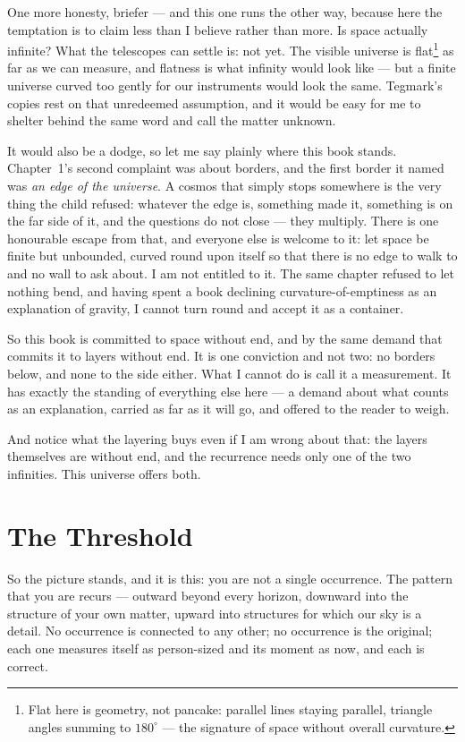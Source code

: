\documentclass[fontsize=11pt,paper=a4,pagesize=auto,parskip=half-]{scrbook}
\begin{document}
One more honesty, briefer --- and this one runs the other way, because here the temptation is to claim less than I believe rather than more. Is space actually infinite? What the telescopes can settle is: not yet. The visible universe is flat\footnote{Flat here is geometry, not pancake: parallel lines staying parallel, triangle angles summing to $180^{\circ}$ --- the signature of space without overall curvature.} as far as we can measure, and flatness is what infinity would look like --- but a finite universe curved too gently for our instruments would look the same. Tegmark's copies rest on that unredeemed assumption, and it would be easy for me to shelter behind the same word and call the matter unknown.

It would also be a dodge, so let me say plainly where this book stands. Chapter~1's second complaint was about borders, and the first border it named was \emph{an edge of the universe}. A cosmos that simply stops somewhere is the very thing the child refused: whatever the edge is, something made it, something is on the far side of it, and the questions do not close --- they multiply. There is one honourable escape from that, and everyone else is welcome to it: let space be finite but unbounded, curved round upon itself so that there is no edge to walk to and no wall to ask about. I am not entitled to it. The same chapter refused to let nothing bend, and having spent a book declining curvature-of-emptiness as an explanation of gravity, I cannot turn round and accept it as a container.

So this book is committed to space without end, and by the same demand that commits it to layers without end. It is one conviction and not two: no borders below, and none to the side either. What I cannot do is call it a measurement. It has exactly the standing of everything else here --- a demand about what counts as an explanation, carried as far as it will go, and offered to the reader to weigh.

And notice what the layering buys even if I am wrong about that: the layers themselves are without end, and the recurrence needs only one of the two infinities. This universe offers both.

\section{The Threshold}

So the picture stands, and it is this: you are not a single occurrence. The pattern that you are recurs --- outward beyond every horizon, downward into the structure of your own matter, upward into structures for which our sky is a detail. No occurrence is connected to any other; no occurrence is the original; each one measures itself as person-sized and its moment as now, and each is correct.
\end{document}
